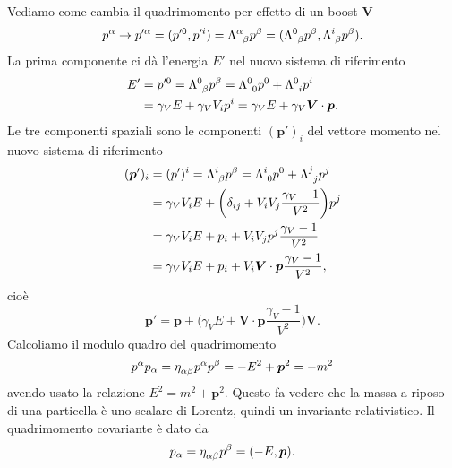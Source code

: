 Vediamo come cambia il quadrimomento per effetto di un boost $\bm{V}$
\begin{equation}
  p^{\alpha} \to p'^{\alpha} = (p'^{0}, p'^{i}) =
  \tensor{\Lambda}{^{\alpha}_{\beta}} p^{\beta} =
  (\tensor{\Lambda}{^{0}_{\beta}}p^{\beta},
  \tensor{\Lambda}{^{i}_{\beta}}p^{\beta}).
\end{equation}
La prima componente ci dà l'energia $E'$ nel nuovo sistema di riferimento
\begin{equation}
  \begin{split}
    E' &= p'^{0} = \tensor{\Lambda}{^{0}_{\beta}}p^{\beta} =
    \tensor{\Lambda}{^{0}_{0}}p^{0} + \tensor{\Lambda}{^{0}_{i}}p^{i} \\
    &= \gamma_{V} E + \gamma_{V} V_{i}p^{i} = \gamma_{V} E + \gamma_{V}
    \bm{V}\cdot\bm{p}.
  \end{split}
\end{equation}
Le tre componenti spaziali sono le componenti $(\bm{p}')_{i}$ del vettore
momento nel nuovo sistema di riferimento
\begin{equation}
  \begin{split}
    (\bm{p}')_{i} &= (p')^{i} = \tensor{\Lambda}{^{i}_{\beta}}p^{\beta} =
    \tensor{\Lambda}{^{i}_{0}}p^{0} + \tensor{\Lambda}{^{j}_{j}}p^{j} \\
    &= \gamma_{V} V_{i}E + \bigg( \delta_{ij} +
    V_{i}V_{j}\frac{\gamma_{V}-1}{V^{2}}\bigg)p^{j} \\
    &= \gamma_{V} V_{i}E + p_{i} +
    V_{i}V_{j}p^{j}\frac{\gamma_{V}-1}{V^{2}} \\
    &= \gamma_{V} V_{i}E + p_{i} + V_{i} \bm{V} \cdot \bm{p}
    \frac{\gamma_{V}-1}{V^{2}},
  \end{split}
\end{equation}
cioè
\begin{equation}
  \bm{p}' = \bm{p} + \bigg(\gamma_{V} E + \bm{V} \cdot \bm{p}
  \frac{\gamma_{V}-1}{V^{2}}\bigg)\bm{V}.
\end{equation}
Calcoliamo il modulo quadro del quadrimomento
\begin{equation}
  p^{\alpha}p_{\alpha} = \tensor{\eta}{_{\alpha\beta}}p^{\alpha}p^{\beta} =
  -E^{2} + \bm{p}^{2} = -m^{2}
\end{equation}
avendo usato la relazione $E^{2} = m^{2} + \bm{p}^{2}$.  Questo fa vedere che la
massa a riposo di una particella è uno scalare di Lorentz, quindi un invariante
relativistico.  Il quadrimomento covariante è dato da
\begin{equation}
  p_{\alpha} = \tensor{\eta}{_{\alpha\beta}}p^{\beta} = (-E, \bm{p}).
\end{equation}

